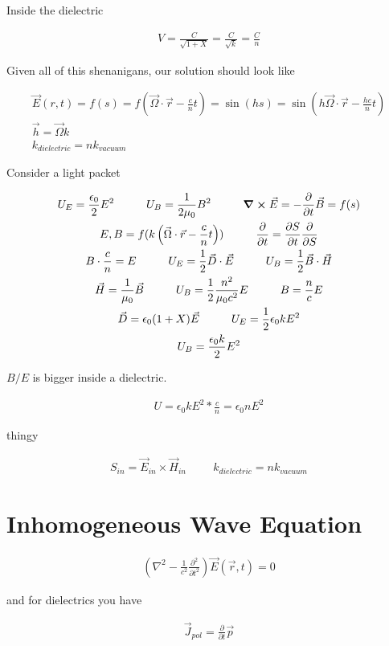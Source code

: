 \documentclass[fleqn]{report}
\newcommand{\hp}{\hspace{1cm}}
\newcommand{\del}{\partial}
\newcommand{\equations} [1] {
\begin{gather*}
#1
\end{gather*}
}
\begin{document}
Inside the dielectric 
\equations{
    V 
    =
    \frac{C}{\sqrt{1 + X}}
    =
    \frac{C}{\sqrt{k}}
    =
    \frac{C}{n}
}

Given all of this shenanigans, our solution should look like 
\equations{
    \vec E(r, t)
    =
    f(s)
    =
    f(\vec \Omega \cdot \vec r - \frac{c}{n} t)
    =
    \sin(h s)
    =
    \sin(h \vec \Omega \cdot \vec r - \frac{h c}{n} t)
    \\
    \vec h = \vec \Omega k
    \\
    k_{dielectric}
    =
    n k_{vacuum}
}

Consider a light packet 
\equations{
    U_{E}
    =
    \frac{\epsilon_0}{2} E^2
    \hp 
    U_B 
    =
    \frac{1}{2 \mu_0} B^2
    \hp 
    \curl \vec E 
    =
    - \frac{\del}{\del t}
    \vec B
    =
    f(s)
    \\
    E, B =
    f(k \left( \vec \Omega \cdot \vec r - \frac{c}{n} t \right) )
    \hp
    \frac{\del}{\del t}
    =
    \frac{\del S}{\del t}
    \frac{\del }{\del S}
    \\
    B \cdot \frac{c}{n}
    =
    E
    \hp 
    U_E 
    =
    \frac{1}{2} \vec D \cdot \vec E 
    \hp
    U_B 
    =
    \frac{1}{2} \vec B \cdot \vec H 
    \\
    \vec H = \frac{1}{\mu_0} \vec B 
    \hp 
    U_B 
    =
    \frac{1}{2}
    \frac{n^2}{\mu_0 c^2} E
    \hp 
    B 
    =
    \frac{n}{c} E 
    \\
    \vec D 
    =
    \epsilon_0 
    (1 + X) \vec E 
    \hp 
    U_E 
    =
    \frac{1}{2} \epsilon_0 k E^2
    \\
    U_B 
    =
    \frac{\epsilon_0 k}{2}
    E^2 
}

$B/E$ is bigger inside a dielectric. 

\equations{
    U 
    = 
    \epsilon_0 k E^2 * \frac{c}{n} 
    =
    \epsilon_0 n E^2
}

thingy 
\equations{
    S_{in}
    =
    \vec E_{in}
    \times 
    \vec H_{in}
    \hp 
    k_{dielectric}
    =
    n k_{vacuum}
}

\section{Inhomogeneous Wave Equation}
\equations{
    \left(
        \nabla^2 
        -
        \frac{1}{c^2}
        \frac{\del^2}{\del t^2}
    \right)
    \vec E(\vec r, t)
    =
    0
}

and for dielectrics you have 
\equations{
    \vec J_{pol}
    =
    \frac{\del}{\del t}
    \vec p
}
\end{document}

